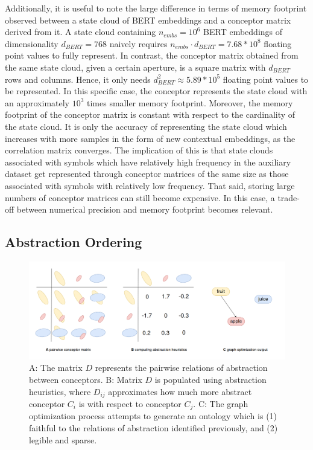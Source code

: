 Additionally, it is useful to note the large difference in terms of memory footprint observed between a state cloud of BERT embeddings and a conceptor matrix derived from it. A state cloud containing $n_{embs} = 10^6$ BERT embeddings of dimensionality $d_{BERT}=768$ naively requires $n_{embs} \cdot d_{BERT} = 7.68 * 10^8$ floating point values to fully represent. In contrast, the conceptor matrix obtained from the same state cloud, given a certain aperture, is a square matrix with $d_{BERT}$ rows and columns. Hence, it only needs $d_{BERT}^2 \approx 5.89 * 10^5$ floating point values to be represented. In this specific case, the conceptor represents the state cloud with an approximately $10^3$ times smaller memory footprint. Moreover, the memory footprint of the conceptor matrix is constant with respect to the cardinality of the state cloud. It is only the accuracy of representing the state cloud which increases with more samples in the form of new contextual embeddings, as the correlation matrix converges. The implication of this is that state clouds associated with symbols which have relatively high frequency in the auxiliary dataset get represented through conceptor matrices of the same size as those associated with symbols with relatively low frequency. That said, storing large numbers of conceptor matrices can still become expensive. In this case, a trade-off between numerical precision and memory footprint becomes relevant.

\subsection{Abstraction Ordering}

\begin{figure}[h]
    \centering
    \includegraphics[width=\textwidth]{img/conceptors-graph.png}
    \caption{A: The matrix $D$ represents the pairwise relations of abstraction between conceptors. B: Matrix $D$ is populated using abstraction heuristics, where $D_{ij}$ approximates how much more abstract conceptor $C_i$ is with respect to conceptor $C_j$. C: The graph optimization process attempts to generate an ontology which is (1) faithful to the relations of abstraction identified previously, and (2) legible and sparse.}\label{fig:conceptors-graph}
\end{figure}

